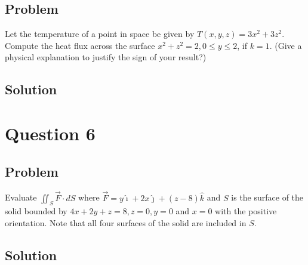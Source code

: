 \documentclass[12pt]{article}
\begin{document}
\subsection{Problem}

Let the temperature of a point in space be given by \(T(x, y, z)= 3x^2 + 3z^2\).
Compute the heat flux across the surface \(x^2 + z^2 = 2, 0 \leq y \leq 2\), if \(k = 1\).
(Give a physical explanation to justify the sign of your result?)

\subsection{Solution}



\newpage
\section{Question 6}

\subsection{Problem}

Evaluate \(\iint_S \vec{F} \cdot d S\) where
\(\vec{F} = y \hat{\imath} + 2x \hat{\jmath} + (z - 8) \hat{k}\) and \(S\) is the surface of the
solid bounded by \(4x + 2y + z = 8, z = 0, y = 0\) and \(x = 0\) with the positive orientation.
Note that all four surfaces of the solid are included in \(S\).

\subsection{Solution}



\newpage


\nocite{El-Deeb_PEU-218_Assignments}
\end{document}
